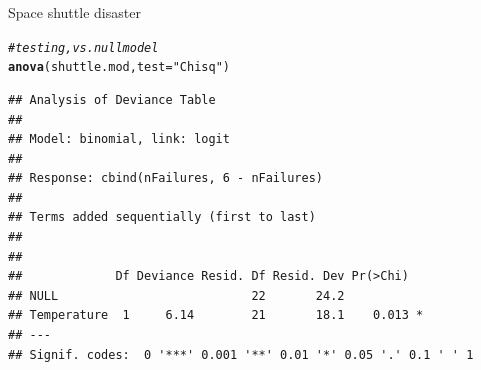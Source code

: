 \documentclass[11pt]{book}\usepackage[]{graphicx}\usepackage[]{color}
\makeatletter
\newcommand{\hlstr}[1]{\textcolor[rgb]{0.192,0.494,0.8}{#1}}%
\newcommand{\hlcom}[1]{\textcolor[rgb]{0.678,0.584,0.686}{\textit{#1}}}%
\newcommand{\hlstd}[1]{\textcolor[rgb]{0.345,0.345,0.345}{#1}}%
\newcommand{\hlkwc}[1]{\textcolor[rgb]{0.333,0.667,0.333}{#1}}%
\newcommand{\hlkwd}[1]{\textcolor[rgb]{0.737,0.353,0.396}{\textbf{#1}}}%
\newenvironment{kframe}{%
 \def\at@end@of@kframe{}%
 \ifinner\ifhmode%
  \def\at@end@of@kframe{\end{minipage}}%
  \begin{minipage}{\columnwidth}%
 \fi\fi%
 \def\FrameCommand##1{\hskip\@totalleftmargin \hskip-\fboxsep
 \colorbox{shadecolor}{##1}\hskip-\fboxsep
     \hskip-\linewidth \hskip-\@totalleftmargin \hskip\columnwidth}%
 \MakeFramed {\advance\hsize-\width
   \@totalleftmargin\z@ \linewidth\hsize
   \@setminipage}}%
 {\par\unskip\endMakeFramed%
 \at@end@of@kframe}
\newenvironment{knitrout}{}{} %
\renewenvironment{knitrout}{\small\renewcommand{\baselinestretch}{.85}}{} %
\makeatother
\begin{document}
\begin{Example}{Space shuttle disaster}
\begin{knitrout}
\begin{kframe}
\begin{alltt}
\hlcom{# testing, vs. null model}
\hlkwd{anova}\hlstd{(shuttle.mod,} \hlkwc{test}\hlstd{=}\hlstr{"Chisq"}\hlstd{)}
\end{alltt}
\begin{verbatim}
## Analysis of Deviance Table
## 
## Model: binomial, link: logit
## 
## Response: cbind(nFailures, 6 - nFailures)
## 
## Terms added sequentially (first to last)
## 
## 
##             Df Deviance Resid. Df Resid. Dev Pr(>Chi)  
## NULL                           22       24.2           
## Temperature  1     6.14        21       18.1    0.013 *
## ---
## Signif. codes:  0 '***' 0.001 '**' 0.01 '*' 0.05 '.' 0.1 ' ' 1
\end{verbatim}
\end{kframe}
\end{knitrout}


\end{Example}
\end{document}
